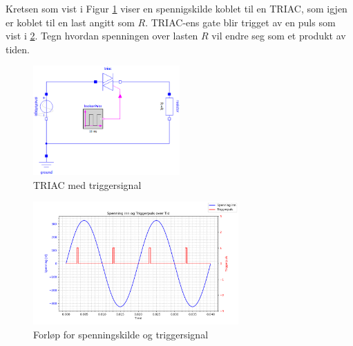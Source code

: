 \begin{question}[name=Spørsmål, topic=tyristor]
	Kretsen som vist i Figur \ref{fig:triacTriggplot} viser en spennigskilde koblet til en TRIAC, som igjen er koblet til en last angitt som $R$. TRIAC-ens gate blir trigget av en puls som vist i \ref{fig:triacForTriggplot}. Tegn hvordan spenningen over lasten $R$ vil endre seg som et produkt av tiden.
	\begin{figure}[H]
		\centering
		\includegraphics[width=0.5\textwidth]{tyristor/figurer/triac.png}
		\caption{TRIAC med triggersignal}
		\label{fig:triacTriggplot}
	\end{figure}
	
	\begin{figure}[H]
		\centering
		\includegraphics[width=0.7\textwidth]{tyristor/plot/triac.png}
		\caption{Forløp for spenningskilde og triggersignal}
		\label{fig:triacForTriggplot}
	\end{figure}
	
	
\end{question}

\vspace{0.5cm} %

